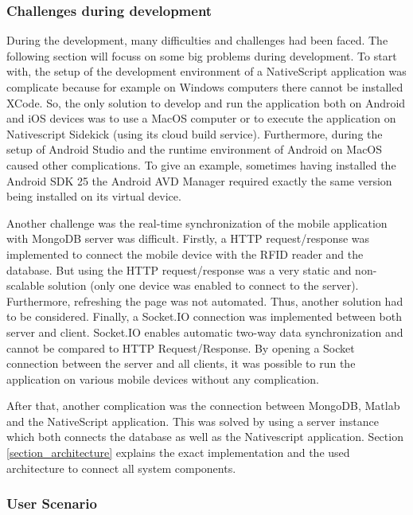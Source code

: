 \subsubsection{Challenges during development} \label{challenge}

During the development, many difficulties and challenges had been faced. The following section will focuss on some big problems during development.
To start with, the setup of the development environment of a NativeScript application was complicate because for example on Windows computers there cannot be installed XCode. So, the only solution to develop and run the application both on Android and iOS devices was to use a MacOS computer or to execute the application on Nativescript Sidekick (using its cloud build service). Furthermore, during the setup of Android Studio and the runtime environment of Android on MacOS caused other complications. To give an example, sometimes having installed the Android \ac{SDK} 25 the Android \ac{AVD} Manager required exactly the same version being installed on its virtual device. 

Another challenge was the real-time synchronization of the mobile application with MongoDB server was difficult. Firstly, a HTTP request/response was implemented to connect the mobile device with the RFID reader and the database. But using the HTTP request/response was a very static and non-scalable solution (only one device was enabled to connect to the server). Furthermore, refreshing the page was not automated. Thus, another solution had to be considered. Finally, a Socket.IO connection was implemented between both server and client. Socket.IO enables automatic two-way data synchronization and cannot be compared to HTTP Request/Response. By opening a Socket connection between the server and all clients, it was possible to run the application on various mobile devices without any complication. 

After that, another complication was the connection between MongoDB, Matlab and the NativeScript application. This was solved by using a server instance which both connects the database as well as the Nativescript application. Section \ref{section_architecture} explains the exact implementation and the used architecture to connect all system components. 

\subsubsection{User Scenario}


